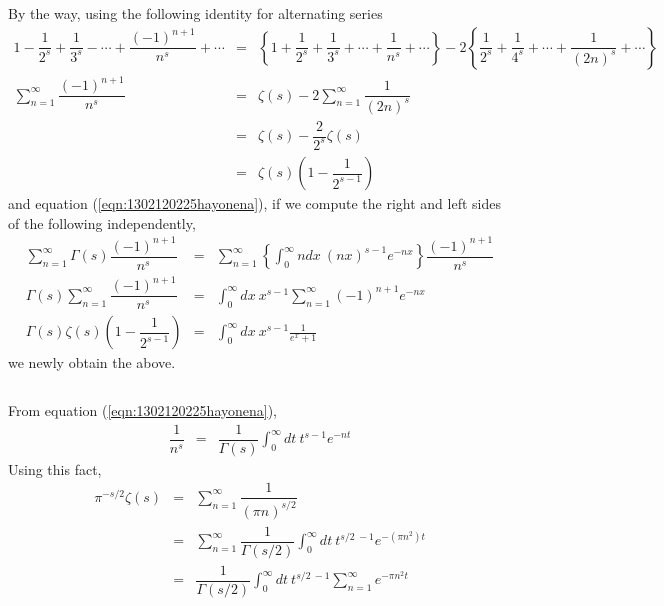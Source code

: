 \documentclass[uplatex,a4j,12pt,dvipdfmx]{jsarticle}
\begin{document}
By the way, using the following identity for alternating series
\begin{eqnarray}
	1
	-
	\dfrac{1}{2^{s}}
	+
	\dfrac{1}{3^{s}}
	-
	\cdots
	+
	\dfrac{(-1)^{n+1}}{n^{s}}
	+
	\cdots
	&=&
	\left\{
	1
	+
	\dfrac{1}{2^{s}}
	+
	\dfrac{1}{3^{s}}
	+
	\cdots
	+
	\dfrac{1}{n^{s}}
	+
	\cdots
	\right\}
	-
	2
	\left\{
	\dfrac{1}{2^{s}}
	+
	\dfrac{1}{4^{s}}
	+
	\cdots
	+
	\dfrac{1}{(2n)^{s}}
	+
	\cdots
	\right\}
	\nonumber \\
	\sum_{n=1}^{\infty}
	\dfrac{(-1)^{n+1}}{n^{s}}
	&=&
	\zeta(s)
	-
	2
	\sum_{n=1}^{\infty}
	\dfrac{1}{(2n)^{s}}
	\nonumber \\ &=&
	\zeta(s)
	-
	\dfrac{2}{2^{s}}
	\zeta(s)
	\nonumber \\ &=&
	\zeta(s)
	\left(
	1
	-
	\dfrac{1}{2^{s-1}}
	\right)
\end{eqnarray}
and equation (\ref{eqn:1302120225hayonena}), if we compute the right and left sides of the following independently,
\begin{eqnarray}
	\sum_{n=1}^{\infty}
	\Gamma(s)
	\dfrac{(-1)^{n+1}}{n^{s}}
	&=&
	\sum_{n=1}^{\infty}
	\left\{
	\int^{\infty}_{0}
	\!\! ndx
	\ \! (nx)^{s-1} e^{-nx}
	\right\}
	\dfrac{(-1)^{n+1}}{n^{s}}
	\nonumber \\
	\Gamma(s)
	\sum_{n=1}^{\infty}
	\dfrac{(-1)^{n+1}}{n^{s}}
	&=&
	\int^{\infty}_{0}
	\!\! dx
	\ \! x^{s-1}
	\sum_{n=1}^{\infty}
	(-1)^{n+1}
	e^{-nx}
	\nonumber \\
	\Gamma(s)
	\zeta(s)
	\left(
	1
	-
	\dfrac{1}{2^{s-1}}
	\right)
	&=&
	\int^{\infty}_{0}
	\!\! dx
	\ \! x^{s-1}
	\frac{1}{e^{x} + 1}
\end{eqnarray}
we newly obtain the above.

${}$

From equation (\ref{eqn:1302120225hayonena}),
\begin{eqnarray}
	\dfrac{1}{n^{s}}
	&=&
	\dfrac{1}{\Gamma(s)}
	\int^{\infty}_{0}
	dt \ \! t^{s-1} e^{-nt}
\end{eqnarray}
Using this fact,
\begin{eqnarray}
	\pi^{-s/2}
	\zeta(s)
	&=&
	\sum_{n=1}^{\infty}
	\dfrac{1}{(\pi n )^{s/2}}
	\nonumber \\ &=&
	\sum_{n=1}^{\infty}
	\dfrac{1}{\Gamma(s/2)}
	\int^{\infty}_{0}
	dt \ \! t^{s/2 \ \! -1} e^{-(\pi n^{2})t}
	\nonumber \\ &=&
	\dfrac{1}{\Gamma(s/2)}
	\int^{\infty}_{0}
	dt \ \! t^{s/2 \ \! -1}
	\sum_{n=1}^{\infty}
	e^{- \pi n^{2} t}
\end{eqnarray}
\end{document}
